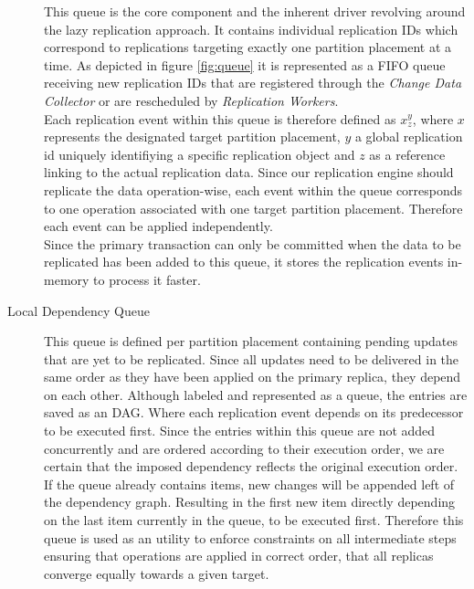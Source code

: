 \begin{description}
    This queue is the core component and the inherent driver revolving around the lazy replication approach. 
    It contains individual replication IDs which correspond to replications targeting exactly one partition placement at a time.
    As depicted in figure \ref{fig:queue} it is represented as a FIFO queue receiving new replication IDs that are registered through the \emph{Change Data Collector} 
    or are rescheduled by \emph{Replication Workers}.\\
    Each replication event within this queue is therefore defined as $x_{z}^y$, where $x$ represents the designated target partition placement, $y$ a global
    replication id uniquely identifiying a specific replication object and $z$ as a reference linking to the actual replication data. 
    Since our replication engine should replicate the data operation-wise, each event within the queue corresponds to one operation associated with one target partition placement.
    Therefore each event can be applied independently.\\Since the primary transaction can only be committed when the data to be replicated has been added to this queue,
    it stores the replication events in-memory to process it faster.

  
    \item[Local Dependency Queue] This queue is defined per partition placement containing pending updates that are yet to be replicated. 
    Since all updates need to be delivered in the same order as they have been applied on the primary replica, they depend on each other. 
    Although labeled and represented as a queue, the entries are saved as an DAG. Where each replication event depends on its predecessor to be executed first.
    Since the entries within this queue are not added concurrently and are ordered according to their execution order, we are certain that the imposed dependency
    reflects the original execution order. If the queue already contains items, new changes will be appended left of the dependency graph. 
    Resulting in the first new item directly depending on the last item currently in the queue, to be executed first. 
    Therefore this queue is used as an utility to enforce constraints on all intermediate steps ensuring that operations are applied 
    in correct order, that all replicas converge equally towards a given target. 



\end{description}
